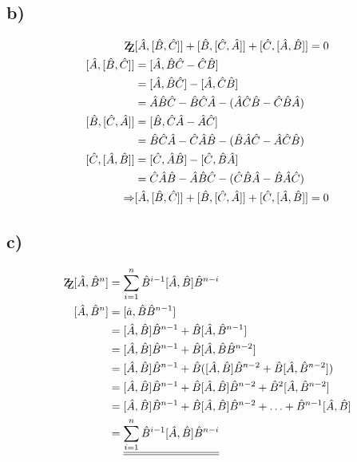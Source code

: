     \subsection{b)}
    \begin{align}
    \mathrm{Z\kern-.3em\raise-0.5ex\hbox{Z}} &[\hat A , [\hat B , \hat C]] + [\hat B ,[\hat C, \hat A]]+ [\hat C,[\hat A , \hat B]] =0\\
    [\hat A , [\hat B , \hat C]] &= [\hat A, \hat B \hat C - \hat C \hat B] \\
    &=[\hat A , \hat B \hat C] -[\hat A , \hat C \hat B]\\
    &= \hat A \hat B \hat C -\hat B \hat C \hat A- (\hat A \hat C \hat B-\hat C \hat B \hat A)\\
    [\hat B , [\hat C , \hat A]] &= [\hat B, \hat C \hat A-\hat A \hat C]\\
    &= \hat B \hat C \hat A - \hat C \hat A \hat B - (\hat B \hat A \hat C - \hat A \hat C \hat B)\\
    [\hat C , [\hat A , \hat B]] &= [\hat C , \hat A \hat B]- [\hat C , \hat B \hat A]\\
    &= \hat C \hat A \hat B - \hat A \hat B \hat C -(\hat C \hat B \hat A - \hat B \hat A \hat C)\\
    \Rightarrow &[\hat A , [\hat B , \hat C]] + [\hat B , [\hat C , \hat A]] +[\hat C , [\hat A , \hat B]] = 0
    \end{align}
    \subsection{c)}
    \begin{align}
    \mathrm{Z\kern-.3em\raise-0.5ex\hbox{Z}} [\hat A , \hat B ^n] &= \sum_{i=1}^n \hat B ^{i-1} [\hat A , \hat B ] \hat B ^{n-i}\\
    [\hat A , \hat B ^n] &= [\hat a , \hat B \hat B ^{n-1}]\\
    &= [\hat A , \hat B] \hat B ^{n-1} + \hat B [\hat A , \hat B ^{n-1}]\\
    &= [\hat A , \hat B] \hat B ^{n-1} + \hat B [\hat A , \hat B \hat B ^{n-2}] \\
    &= [\hat A , \hat B] \hat B ^{n-1} + \hat B ([\hat A , \hat B] \hat B ^{n-2} + \hat B [\hat A , \hat B ^ {n-2} ] )\\
    &= [\hat A , \hat B] \hat B ^{n-1} + \hat B [\hat A , \hat B] \hat B ^{n-2} + \hat B ^2 [\hat  A , \hat B ^{n-2}]\\
    &= [\hat A , \hat B] \hat B ^{n-1} + \hat B [\hat A, \hat B] \hat B ^{n-2} + \hdots + \hat B ^{n-1} [\hat A , \hat B]\\
    &=\underline{\underline{ \sum_{i=1}^n \hat B ^{i-1} [\hat A , \hat B] \hat B ^{n-i}}}
    \end{align}
